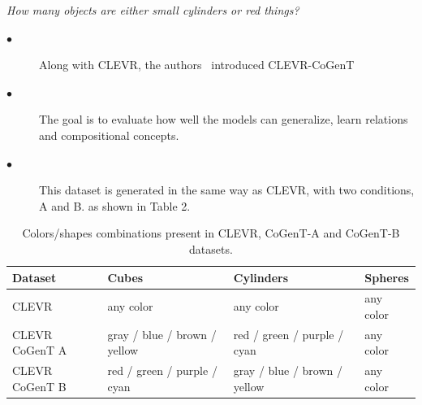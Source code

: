 \documentclass[final,paperwidth=36in,paperheight=48in,portrait,fontscale=0.36]{baposter}
\begin{document}
\begin{poster}
{    
    \begin{description}
    	\centering
    	\item[$\cdot$] \textit{How many objects are either small cylinders or red things?}
    	
    \end{description}


   \begin{description}
   	\item[$\bullet$]Along with CLEVR, the authors~\cite{johnson2017clevr} introduced  CLEVR-CoGenT 
   	\item[$\bullet$] The goal is to evaluate how well the models can generalize, learn relations and compositional concepts.
   	\item[$\bullet$] This dataset is generated in the same way as CLEVR, with two conditions, A and B. as shown in Table 2.

   \end{description}

	\begin{table}[H]
		\centering
		\begin{tabular}{llll}
			\toprule
			Dataset        & Cubes              & Cylinders &  Spheres         \\
			\midrule
			CLEVR   &  any color &  any color        &    any color    \\
			CLEVR CoGenT A & gray / blue / brown / yellow  & red / green / purple / cyan       &    any color  \\
			CLEVR CoGenT B  & red / green / purple / cyan &   gray / blue / brown / yellow       &      any color  \\
			\bottomrule
		\end{tabular}
		\caption{Colors/shapes combinations present in CLEVR, CoGenT-A and CoGenT-B datasets.}
		\label{tab:cogent_conditions}
	\end{table}
	
}




\end{poster}
\end{document}
